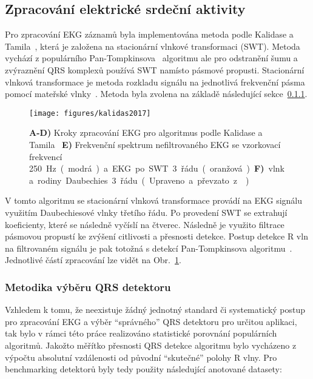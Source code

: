 \subsection{Zpracování elektrické srdeční aktivity}
\label{subsec:zpracovani_ekg}
Pro zpracování EKG záznamů byla implementována metoda podle Kalidase a
Tamila~\cite{kalidas2017}, která je založena na stacionární vlnkové transformaci
(\gls{SWT}). Metoda vychází z populárního Pan-Tompkinsova~\cite{Tompkins1985}
algoritmu ale pro odstranění šumu a zvýraznění QRS komplexů používá \gls{SWT}
namísto pásmové propusti. Stacionární vlnková transformace je metoda rozkladu
signálu na jednotlivá frekvenční pásma pomocí mateřské vlnky~\cite{Nason1995}.
Metoda byla zvolena na základě následující sekce~\ref{subsubsec:vyberqrs}.

\begin{figure}[H]
    \begin{center}
        \texttt{[image: figures/kalidas2017]}
        \caption{\textbf{A-D)} Kroky zpracování EKG pro algoritmus podle
            Kalidase a Tamila~\cite{kalidas2017} \textbf{E)} Frekvenční spektrum
            nefiltrovaného EKG se vzorkovací frekvencí 250~\si\Hz~(modrá) a EKG po
            SWT 3. řádu (oranžová). \textbf{F)} vlnka rodiny Daubechies 3. řádu.
            (Upraveno a převzato z~\cite{Porr2019})}
        \label{fig:kalidas_processing}
    \end{center}
\end{figure}

V tomto algoritmu se stacionární vlnková transformace provádí na EKG signálu
využitím Daubechiesové vlnky třetího řádu. Po provedení \gls{SWT} se extrahují
koeficienty, které se následně vyčíslí na čtverec. Následně je využito filtrace
pásmovou propustí ke zvýšení citlivosti a přesnosti detekce. Postup detekce R
vln na filtrovaném signálu je pak totožná s detekcí Pan-Tompkinsova
algoritmu~\cite{Tompkins1985}. Jednotlivé částí zpracování lze vidět na
Obr.~\ref{fig:kalidas_processing}.

\subsubsection{Metodika výběru QRS detektoru}
\label{subsubsec:vyberqrs}
Vzhledem k tomu, že neexistuje žádný jednotný standard či systematický postup
pro zpracování EKG a výběr \enquote{správného} QRS detektoru pro určitou
aplikaci, tak bylo v rámci této práce realizováno statistické porovnání
populárních algoritmů. Jakožto měřítko přesnosti QRS detekce algoritmu bylo
vycházeno z výpočtu absolutní vzdálenosti od původní \enquote{skutečné} polohy R
vlny. Pro benchmarking detektorů byly tedy použity následující anotované
datasety:


